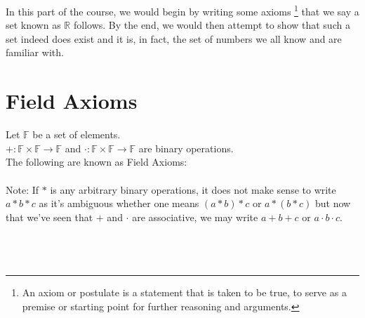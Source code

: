 In this part of the course, we would begin by writing some axioms%
\footnote{An axiom or postulate is a statement that is taken to be true, to serve as a premise or starting point for further reasoning and arguments.}%
that we say a set known as $\mathbb{R}$ follows. By the end, we would then attempt to show that such a set indeed does exist and it is, in fact, the set of numbers we all know and are familiar with.%
%
\section{Field Axioms}\label{sec:field}
Let $\mathbb{F}$ be a set of elements.\\
$+:\mathbb{F} \times \mathbb{F} \to \mathbb{F}$ and $\cdot:\mathbb{F}\times \mathbb{F} \to \mathbb{F}$ are binary operations.\\
The following are known as Field Axioms:
\\~\\
Note: If $*$ is any arbitrary binary operations, it does not make sense to write $a*b*c$ as it's ambiguous whether one means $(a*b)*c$ or $a*(b*c)$ but now that we've seen that $+$ and $\cdot$ are associative, we may write $a+b+c$ or $a\cdot b\cdot c$.
\\
\\
\\
\\

